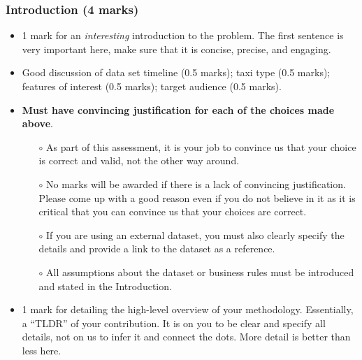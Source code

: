 \documentclass[12pt]{article}
\begin{document}
\subsubsection*{Introduction (4 marks)}
\begin{itemize}
    \item 1 mark for an \emph{interesting} introduction to the problem. The first sentence is very important here, make sure that it is concise, precise, and engaging. 
    \item Good discussion of data set timeline (0.5 marks); taxi type (0.5 marks); features of interest (0.5 marks); target audience (0.5 marks).
    \item \textbf{Must have convincing justification for each of the choices made above}. 
    \begin{itemize} 
        \item[$\circ$] As part of this assessment, it is your job to convince us that your choice is correct and valid, not the other way around. 
        \item[$\circ$] No marks will be awarded if there is a lack of convincing justification. Please come up with a good reason even if you do not believe in it as it is critical that you can convince us that your choices are correct.
        \item[$\circ$] If you are using an external dataset, you must also clearly specify the details and provide a link to the dataset as a reference. 
        \item[$\circ$] All assumptions about the dataset or business rules must be introduced and stated in the Introduction.
    \end{itemize}
    \item 1 mark for detailing the high-level overview of your methodology. Essentially, a ``TLDR'' of your contribution. It is on you to be clear and specify all details, not on us to infer it and connect the dots. More detail is better than less here. 
\end{itemize}
\end{document}
